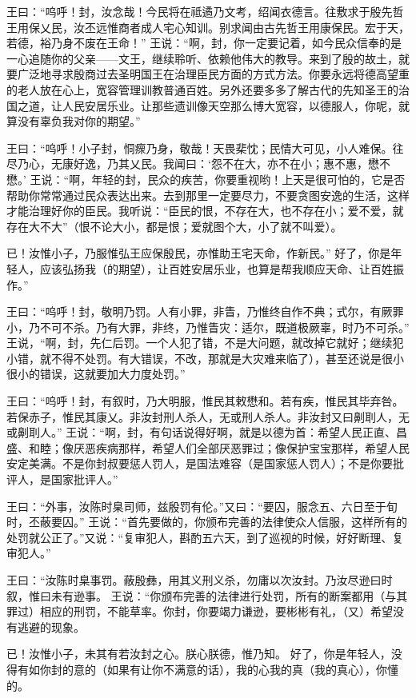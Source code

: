 \documentclass[a4paper,12pt,UTF8,twoside]{ctexbook}
\begin{document}
王曰：“呜呼！封，汝念哉！今民将在祗遹乃文考，绍闻衣德言。往敷求于殷先哲王用保乂民，汝丕远惟商者成人宅心知训。别求闻由古先哲王用康保民。宏于天，若德，裕乃身不废在王命！”
王说：“啊，封，你一定要记着，如今民众信奉的是一心追随你的父亲——文王，继续聆听、依赖他伟大的教导。来到了殷的故土，就要广泛地寻求殷商过去圣明国王在治理臣民方面的方式方法。你要永远将德高望重的老人放在心上，宽容管理训教普通百姓。另外还要多多了解古代的先知圣王的治国之道，让人民安居乐业。让那些遗训像天空那么博大宽容，以德服人，你呢，就算没有辜负我对你的期望。”

王曰：“呜呼！小子封，恫瘝乃身，敬哉！天畏棐忱；民情大可见，小人难保。往尽乃心，无康好逸，乃其乂民。我闻曰：‘怨不在大，亦不在小；惠不惠，懋不懋。’
王说：“啊，年轻的封，民众的疾苦，你要重视哟！上天是很可怕的，它是否帮助你常常通过民众表达出来。去到那里一定要尽力，不要贪图安逸的生活，这样才能治理好你的臣民。我听说：“臣民的恨，不存在大，也不存在小；爱不爱，就存在大不大”（恨不论大小，都是恨；爱就图个大，小了就不叫爱）。

已！汝惟小子，乃服惟弘王应保殷民，亦惟助王宅天命，作新民。”
好了，你是年轻人，应该弘扬我（的期望），让百姓安居乐业，也算是帮我顺应天命、让百姓振作。”

王曰：“呜呼！封，敬明乃罚。人有小罪，非眚，乃惟终自作不典；式尔，有厥罪小，乃不可不杀。乃有大罪，非终，乃惟眚灾：适尔，既道极厥辜，时乃不可杀。”
王说，“啊，封，先仁后罚。一个人犯了错，不是大问题，就改掉它就好；继续犯小错，就不得不处罚。有大错误，不改，那就是大灾难来临了），甚至还说是很小很小的错误，这就要加大力度处罚。”

王曰：“呜呼！封，有叙时，乃大明服，惟民其敕懋和。若有疾，惟民其毕弃咎。若保赤子，惟民其康乂。非汝封刑人杀人，无或刑人杀人。非汝封又曰劓刵人，无或劓刵人。”
王说：“啊，封，有句话说得好啊，就是以德为首：希望人民正直、昌盛、和睦；像厌恶疾病那样，希望人们全部厌恶罪过；像保护宝宝那样，希望人民安定美满。不是你封叔要惩人罚人，是国法难容（是国家惩人罚人）；不是你要批评人，是国家批评人。”

王曰：“外事，汝陈时臬司师，兹殷罚有伦。”又曰：“要囚，服念五、六日至于旬时，丕蔽要囚。”
王说：“首先要做的，你颁布完善的法律使众人信服，这样所有的处罚就公正了。”又说：“复审犯人，斟酌五六天，到了巡视的时候，好好断理、复审犯人。”

王曰：“汝陈时臬事罚。蔽殷彝，用其义刑义杀，勿庸以次汝封。乃汝尽逊曰时叙，惟曰未有逊事。
王说：“你颁布完善的法律进行处罚，所有的断案都用（与其罪过）相应的刑罚，不能草率。你封，你要竭力谦逊，要彬彬有礼，（又）希望没有逃避的现象。

已！汝惟小子，未其有若汝封之心。朕心朕德，惟乃知。
好了，你是年轻人，没得有如你封的意的（如果有让你不满意的话），我的心我的真（我的真心），你懂的。
\end{document}
